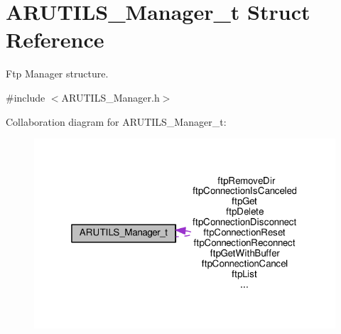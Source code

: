\hypertarget{struct_a_r_u_t_i_l_s___manager__t}{}\section{A\+R\+U\+T\+I\+L\+S\+\_\+\+Manager\+\_\+t Struct Reference}
\label{struct_a_r_u_t_i_l_s___manager__t}


Ftp Manager structure.  




{\ttfamily \#include $<$A\+R\+U\+T\+I\+L\+S\+\_\+\+Manager.\+h$>$}



Collaboration diagram for A\+R\+U\+T\+I\+L\+S\+\_\+\+Manager\+\_\+t\+:
\nopagebreak
\begin{figure}[H]
\begin{center}
\leavevmode
\includegraphics[width=319pt]{struct_a_r_u_t_i_l_s___manager__t__coll__graph}
\end{center}
\end{figure}
